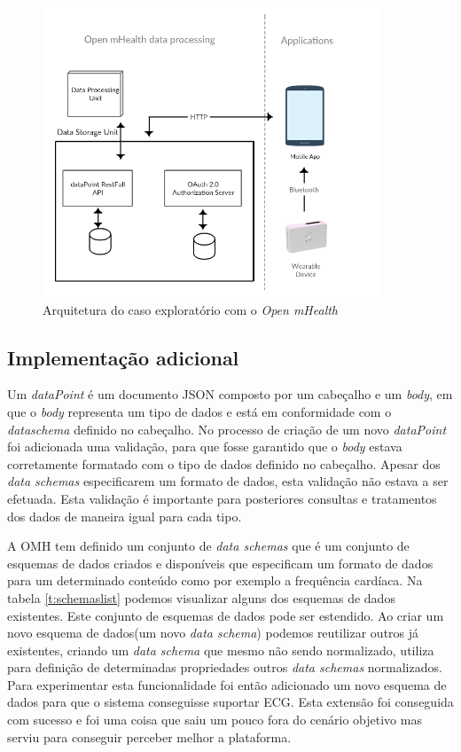 \begin{figure}[H]
  \centering
  \includegraphics[width=0.9\textwidth]{imgs/omh-arch-exp.png}
  \caption[Arquitetura do caso exploratório com o \textit{Open mHealth}]{Arquitetura do caso exploratório com o \textit{Open mHealth}}
  
  \label{f:exp-omh-arch}
\end{figure}

\subsection{Implementação adicional}
\label{additionalImpl-omh}
Um \textit{dataPoint} é um documento \gls{JSON} composto por um cabeçalho e um \textit{body}, em que o \textit{body} representa um tipo de dados e está em conformidade com o \textit{dataschema} definido no cabeçalho.
No processo de criação de um novo \textit{dataPoint} foi adicionada uma validação, para que fosse garantido que o \textit{body} estava corretamente formatado com o tipo de dados definido no cabeçalho.
Apesar dos \textit{data schemas} especificarem um formato de dados, esta validação não estava a ser efetuada. Esta validação é importante para posteriores consultas e tratamentos dos dados de maneira igual para cada tipo.
\par 


A \gls{OMH} tem definido um conjunto de \textit{data schemas} \cite{omhschemas} que é um conjunto de esquemas de dados criados e disponíveis que especificam um formato de dados para um determinado conteúdo como por exemplo a frequência cardíaca\cite{omhschemas}. Na tabela \ref{t:schemaslist} podemos visualizar alguns dos esquemas de dados existentes. Este conjunto de esquemas de dados pode ser estendido. Ao criar um novo esquema de dados(um novo \textit{data schema}) podemos reutilizar outros já existentes, criando um \textit{data schema} que mesmo não sendo normalizado, utiliza para definição de determinadas propriedades outros \textit{data schemas} normalizados. Para experimentar esta funcionalidade foi então adicionado um novo esquema de dados para que o sistema conseguisse suportar \gls{ECG}. Esta extensão foi conseguida com sucesso e foi uma coisa que saiu um pouco fora do cenário objetivo mas serviu para conseguir perceber melhor a plataforma. \par 
\newpage

